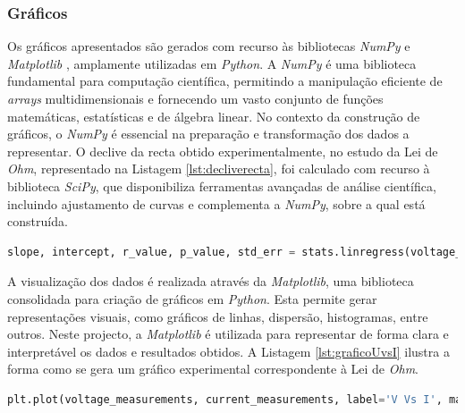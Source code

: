 \subsubsection{Gráficos}
\label{sec:graficos}
Os gráficos apresentados são gerados com recurso às bibliotecas \textit{NumPy} \cite{NumPy} e \textit{Matplotlib} \cite{Matplotlib}, amplamente utilizadas em \textit{Python}. A \textit{NumPy} é uma biblioteca fundamental para computação científica, permitindo a manipulação eficiente de \textit{arrays} multidimensionais e fornecendo um vasto conjunto de funções matemáticas, estatísticas e de álgebra linear. No contexto da construção de gráficos, o \textit{NumPy} é essencial na preparação e transformação dos dados a representar. O declive da recta obtido experimentalmente, no estudo da Lei de \textit{Ohm}, representado na Listagem \ref{lst:decliverecta}, foi calculado com recurso à biblioteca \textit{SciPy}, que disponibiliza ferramentas avançadas de análise científica, incluindo ajustamento de curvas e complementa a \textit{NumPy}, sobre a qual está construída.

\begin{minipage}{0.9\linewidth}
	\begin{lstlisting}[language=Python,escapechar=|, caption=Cálculo do declive da recta, label=lst:decliverecta]
		slope, intercept, r_value, p_value, std_err = stats.linregress(voltage_measurements, current_measurements)
	\end{lstlisting}
\end{minipage}

A visualização dos dados é realizada através da \textit{Matplotlib}, uma biblioteca consolidada para criação de gráficos em \textit{Python}. Esta permite gerar representações visuais, como gráficos de linhas, dispersão, histogramas, entre outros. Neste projecto, a \textit{Matplotlib} é utilizada para representar de forma clara e interpretável os dados e resultados obtidos. A Listagem \ref{lst:graficoUvsI} ilustra a forma como se gera um gráfico experimental correspondente à Lei de \textit{Ohm}.

\begin{minipage}{0.9\linewidth}
	\begin{lstlisting}[language=Python,escapechar=|, caption=Gráfico Corrente \textit{vs} Tensão, label=lst:graficoUvsI]
		plt.plot(voltage_measurements, current_measurements, label='V Vs I', marker = 'o')
	\end{lstlisting}
\end{minipage}


